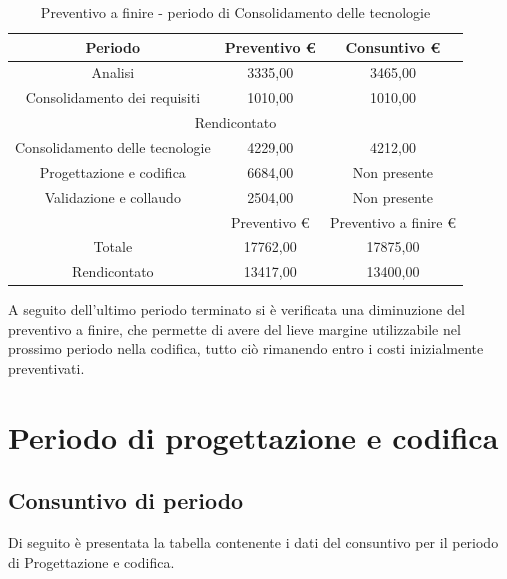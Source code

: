 \documentclass[./PianodiProgetto.tex]{subfiles}
\begin{document}
\begin{table}[H]
	\centering
	\begin{tabular}{|c|c|c|}
		\hline
		Periodo&Preventivo \euro{}&Consuntivo \euro{} \\ \hline
		Analisi&3335,00&3465,00  \\ \hline
		Consolidamento dei requisiti&1010,00&1010,00  \\ \hline
		\multicolumn{3}{|c|}{Rendicontato}  \\ \hline
		Consolidamento delle tecnologie&4229,00&4212,00  \\ \hline
		Progettazione e codifica&6684,00&Non presente  \\ \hline
		Validazione e collaudo&2504,00&Non presente  \\ \hline
		 &Preventivo \euro{}&Preventivo a finire \euro{}  \\ \hline
		Totale&17762,00&17875,00 \\ \hline
		Rendicontato&13417,00&13400,00 \\ \hline
	\end{tabular}
	\caption{Preventivo a finire - periodo di Consolidamento delle tecnologie}
\end{table}

\noindent A seguito dell'ultimo periodo terminato si è verificata una diminuzione del preventivo a finire, che permette di avere del lieve margine utilizzabile nel prossimo periodo nella codifica, tutto ciò rimanendo entro i costi inizialmente preventivati.

\section{Periodo di progettazione e codifica}
\subsection{Consuntivo di periodo}
Di seguito è presentata la tabella contenente i dati del consuntivo per il periodo di Progettazione e codifica.
\end{document}
